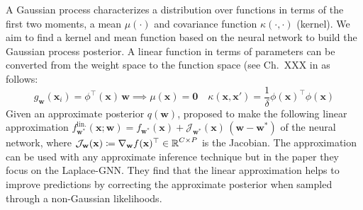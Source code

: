 \documentclass{article}
\newcommand{\weights}{\ensuremath{\mathbf{w}}}
\newcommand{\mbf}[1]{\mathbf{#1}}
\newcommand{\T}{\top}
\newcommand{\vzeros}{\mbf{0}}
\newcommand{\vx}{\mbf{x}}
\newcommand{\vw}{\mbf{w}}
\newcommand{\Jac}[2]{\mathcal{J}_{#1}(#2)}
\begin{document}
%
A Gaussian process characterizes a distribution over functions in terms of the first two moments,  a mean $\mu(\cdot)$ and covariance function $\kappa(\cdot,\cdot)$ (kernel). We aim to find a kernel and mean function based on the neural network to build the Gaussian process posterior.  A linear function in terms of parameters can be converted from the weight space to the function space (see Ch.~XXX in \cite{rasmussen2006gaussian} as follows:
\begin{equation} \label{eq:weight_func}
g_\weights(\mathbf{x}_{i}) = \phi^\top\!(\vx) \, \vw \implies \mu(\vx) = \vzeros \quad \kappa(\mathbf{x}, \mathbf{x}') = \frac{1}{\delta} \phi(\vx)^\top \phi(\vx)
\end{equation}
Given an approximate posterior $q(\vw)$, \citet{immerImprovingPredictionsBayesian2021} proposed to make the following linear approximation
$f^{\textrm{lin.}}_{\vw^*}(\vx; \vw) = f_{\vw^*}(\vx) + \Jac{\weights^*}{\mathbf{x}} \, (\vw - \vw^*)$ of the neural network, where $\Jac{\weights}{\mathbf{x}} \coloneqq \nabla_\weights f(\mathbf{x})^\top \in \R^{C \times P}$ is the Jacobian. The approximation can be used with any approximate inference technique but in the paper they focus on the Laplace-GNN. They find that the linear approximation helps to improve predictions by correcting the approximate posterior when sampled through a non-Gaussian likelihoods.
\end{document}
